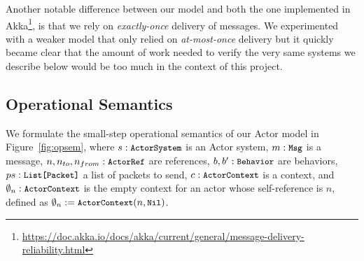 \documentclass[a4paper,twoside]{article}
\newcommand{\RefFig}[1]{Figure~\ref{#1}}
\newcommand{\stt}[1]{\texttt{\small{#1}}}
\begin{document}
Another notable difference between our model and both the one implemented in Akka\footnote{\url{https://doc.akka.io/docs/akka/current/general/message-delivery-reliability.html}}, is that we rely on \textit{exactly-once} delivery of messages. We experimented with a weaker model that only relied on \textit{at-most-once} delivery but it quickly became clear that the amount of work needed to verify the very same systems we describe below would be too much in the context of this project.


\subsection{Operational Semantics}
\label{semantics}

We formulate the small-step operational semantics of our Actor model in 
\RefFig{fig:opsem}, where $s: \stt{ActorSystem}$ is an Actor system,
$m: \stt{Msg}$ is a message,
$n, n_{to}, n_{from}: \stt{ActorRef}$ are references,
$b, b': \stt{Behavior}$ are behaviors,
$ps: \stt{List[Packet]}$ a list of packets to send,
$c: \stt{ActorContext}$ is a context,
and $\emptyset_n: \stt{ActorContext}$ is the empty context for an actor whose
self-reference is $n$, defined as $\emptyset_n := \stt{ActorContext}(n, \stt{Nil})$.
\end{document}

